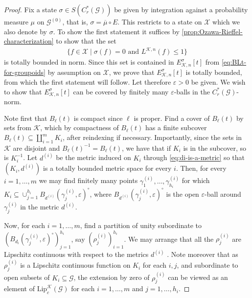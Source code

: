 \documentclass[11pt,a4paper,oneside,final,reqno]{amsart}
\theoremstyle{definition}
\newcommand{\G}{\mathcal{G}}
\newcommand{\Go}{\mathcal{G}^{(0)}}
\newcommand{\cK}{\mathcal{K}}
\newcommand{\cX}{\mathcal{X}}
\newcommand{\Lip}{\mathrm{Lip}}
\newcommand{\Cred}{C_{r}^{*}}
\numberwithin{equation}{section}
\begin{document}
	\begin{proof}
		Fix a state $\sigma \in S(\Cred(\G))$ be given by integration against a probability measure $\mu$ on $\Go$, that is, $\sigma =  \overline{\mu} \circ E$. 
		This restricts to a state on $\cX$ which we also denote by  
		$\sigma$.
		To show the first statement it suffices by  \cref{prop:Ozawa-Rieffel-characterization} to show that the set 
		\begin{align*}
			\{ f \in \cX \mid \sigma(f) = 0 \text{ and } L^{\cK,n}(f) \leq 1  \}
		\end{align*}
		is totally bounded in norm. 
		Since this set is contained in 
		$E^\sigma_{\cK,n}[t]$ from \eqref{eq:BLt-for-groupoids} 
		by assumption on $\cX$, we prove that 
		$E^\sigma_{\cK,n}[t]$
		is totally bounded, from which the first statement will follow.  
		Let therefore $\varepsilon > 0$ be given. We wish to show that 
		$E^\sigma_{\cK,n}[t]$
		can be covered by finitely many $\varepsilon$-balls in the $\Cred(\G)$-norm. 
		
		Note first that $B_\ell(t)$ is compact since $\ell$ is proper. 
		Find a cover of $B_\ell(t)$ by sets from $\cK$, which by compactness of $B_\ell(t)$ has a finite subcover $B_\ell(t) \subseteq \coprod_{i=1}^m K_i$, after reindexing if necessary. Importantly, since the sets in $\cK$ are disjoint and $B_\ell(t)^{-1} = B_\ell(t)$, we have that if $K_i$ is in the subcover, so is $K_i^{-1}$. 
		Let $d^{(i)}$ be the metric induced on $K_i$ through \eqref{eq:di-is-a-metric} so that $(K_i, d^{(i)})$ is a totally bounded metric space for every $i$. 
		Then, for every $i=1,\ldots , m$ we may find finitely many points $\gamma_1^{(i)}, \ldots , \gamma_{h_i}^{(i)}$ for which $K_i \subseteq \cup_{j=1}^{h_i} B_{d^{(i)}}(\gamma_j^{(i)}, \varepsilon)^\circ$, where $B_{d^{(i)}}(\gamma_j^{(i)}, \varepsilon)^\circ$ is the open $\varepsilon$-ball around $\gamma_j^{(i)}$ in the metric $d^{(i)}$.
		

		
		Now, for each $i = 1, \ldots , m$, find a partition of unity subordinate to $(B_{d_i}(\gamma_j^{(i)}, \varepsilon)^\circ)_{j=1}^{h_i}$, say $(\rho_j^{(i)})_{i=1}^{h_i}$. We may arrange that all the $\rho_j^{(i)}$ are Lipschitz continuous with respect to the metrics $d^{(i)}$ \cite[Theorem 2.6.5]{CobzasMiculescuNicolae-LipschitzFunctions2019}.   
		Note moreover that as $\rho_j^{(i)}$ is a Lipschitz continuous  function on $K_i$ for each $i,j$, and subordinate to open subsets of $K_i \subseteq \G$, 
		the extension by zero of $\rho_j^{(i)}$ can be viewed as an element of 
		$\Lip_c^{\cK}(\G)$ 
		for each $i=1, \ldots ,m$ and $j = 1, \ldots, h_i$. 
		

\end{proof}
\end{document}
